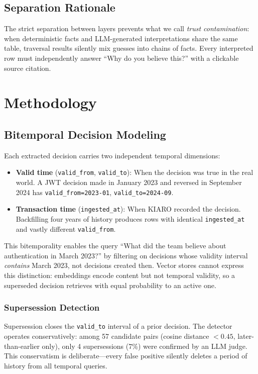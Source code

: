 \documentclass[conference]{IEEEtran}
\begin{document}
\subsection{Separation Rationale}
The strict separation between layers prevents what we call \emph{trust contamination}: when deterministic facts and LLM-generated interpretations share the same table, traversal results silently mix guesses into chains of facts. Every interpreted row must independently answer ``Why do you believe this?'' with a clickable source citation.

\section{Methodology}
\label{sec:methodology}

\subsection{Bitemporal Decision Modeling}

Each extracted decision carries two independent temporal dimensions:

\begin{itemize}
    \item \textbf{Valid time} (\texttt{valid\_from}, \texttt{valid\_to}): When the decision was true in the real world. A JWT decision made in January 2023 and reversed in September 2024 has \texttt{valid\_from=2023-01}, \texttt{valid\_to=2024-09}.
    \item \textbf{Transaction time} (\texttt{ingested\_at}): When KIARO recorded the decision. Backfilling four years of history produces rows with identical \texttt{ingested\_at} and vastly different \texttt{valid\_from}.
\end{itemize}

This bitemporality enables the query ``What did the team believe about authentication in March 2023?'' by filtering on decisions whose validity interval \emph{contains} March 2023, not decisions created then. Vector stores cannot express this distinction: embeddings encode content but not temporal validity, so a superseded decision retrieves with equal probability to an active one.

\subsubsection{Supersession Detection}
Supersession closes the \texttt{valid\_to} interval of a prior decision. The detector operates conservatively: among 57 candidate pairs (cosine distance $< 0.45$, later-than-earlier only), only 4 supersessions (7\%) were confirmed by an LLM judge. This conservatism is deliberate---every false positive silently deletes a period of history from all temporal queries.
\end{document}
